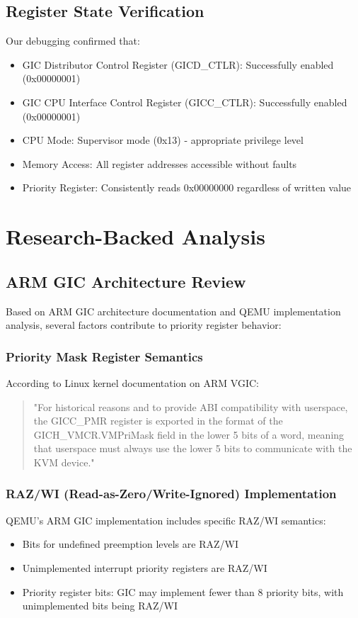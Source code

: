 \documentclass[12pt,a4paper]{article}
\begin{document}
\subsection{Register State Verification}

Our debugging confirmed that:
\begin{itemize}
    \item GIC Distributor Control Register (GICD\_CTLR): Successfully enabled (0x00000001)
    \item GIC CPU Interface Control Register (GICC\_CTLR): Successfully enabled (0x00000001)  
    \item CPU Mode: Supervisor mode (0x13) - appropriate privilege level
    \item Memory Access: All register addresses accessible without faults
    \item Priority Register: Consistently reads 0x00000000 regardless of written value
\end{itemize}

\section{Research-Backed Analysis}

\subsection{ARM GIC Architecture Review}

Based on ARM GIC architecture documentation and QEMU implementation analysis, several factors contribute to priority register behavior:

\subsubsection{Priority Mask Register Semantics}
According to Linux kernel documentation on ARM VGIC:
\begin{quote}
"For historical reasons and to provide ABI compatibility with userspace, the GICC\_PMR register is exported in the format of the GICH\_VMCR.VMPriMask field in the lower 5 bits of a word, meaning that userspace must always use the lower 5 bits to communicate with the KVM device."
\end{quote}

\subsubsection{RAZ/WI (Read-as-Zero/Write-Ignored) Implementation}
QEMU's ARM GIC implementation includes specific RAZ/WI semantics:
\begin{itemize}
    \item Bits for undefined preemption levels are RAZ/WI
    \item Unimplemented interrupt priority registers are RAZ/WI  
    \item Priority register bits: GIC may implement fewer than 8 priority bits, with unimplemented bits being RAZ/WI
\end{itemize}
\end{document}
